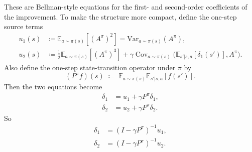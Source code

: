 \documentclass[11pt]{article}
\theoremstyle{definition}
\theoremstyle{remark}
\newcommand{\Var}{\mathrm{Var}}
\newcommand{\E}{\mathbb{E}}
\DeclareMathOperator{\Cov}{Cov}
\begin{document}
These are Bellman-style equations for the first- and second-order coefficients of the improvement. To make the structure more compact, define the one-step source terms
\begin{align}
  u_1(s)
  &\coloneqq
  \E_{a\sim\pi(s)}[(A^\pi)^2]
  =
  \Var_{a\sim\pi(s)}(A^\pi), \\
  u_2(s)
  &\coloneqq
  \frac12 \E_{a\sim\pi(s)}[(A^\pi)^3]
  + \gamma \Cov_{a\sim\pi(s)}\!\bigl(\E_{s'|s,a}[\delta_1(s')],A^\pi\bigr).
\end{align}
Also define the one-step state-transition operator under $\pi$ by
\begin{equation}
  (P^\pi f)(s)
  \;\coloneqq\;
  \E_{a\sim\pi(s)}\E_{s'|s,a}[f(s')].
\end{equation}
Then the two equations become
\begin{align}
  \delta_1 &= u_1 + \gamma P^\pi \delta_1, \\
  \delta_2 &= u_2 + \gamma P^\pi \delta_2.
\end{align}
So
\begin{align}
  \delta_1 &= (I-\gamma P^\pi)^{-1}u_1, \\
  \delta_2 &= (I-\gamma P^\pi)^{-1}u_2.
\end{align}
\end{document}
